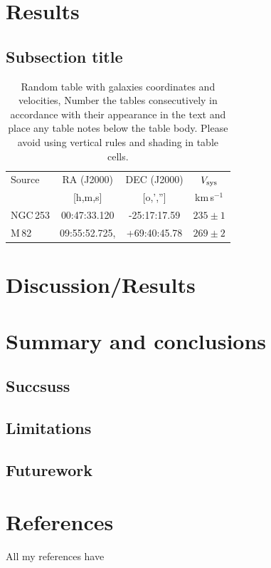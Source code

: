 \documentclass[final,8p,times,twocolumn,authoryear]{elsarticle}
\newcommand{\kms}{km\,s$^{-1}$}
\begin{document}
\section{Results}
\lipsum[2]

\subsection{Subsection title}
\lipsum[3]

\begin{table}
\begin{tabular}{l c c c} 
 \hline
 Source & RA (J2000) & DEC (J2000) & $V_{\rm sys}$ \\ 
        & [h,m,s]    & [o,','']    & \kms          \\
 \hline
 NGC\,253 & 	00:47:33.120 & -25:17:17.59 & $235 \pm 1$ \\ 
 M\,82 & 09:55:52.725, & +69:40:45.78 & $269 \pm 2$ 	 \\ 
 \hline
\end{tabular}
\caption{Random table with galaxies coordinates and velocities, Number the tables consecutively in
accordance with their appearance in the text and place any table notes below the table body. Please avoid using vertical rules and shading in table cells.
}
\label{Table1}
\end{table}


\section{Discussion/Results}
\lipsum[4]

\section{Summary and conclusions}
\subsection{Succsuss}
\subsection{Limitations}
\subsection{Futurework}

\section{References}
All my references have 
\end{document}
